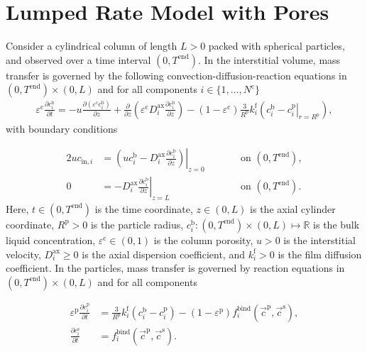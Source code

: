 \documentclass{article}
\begin{document}
\section*{Lumped Rate Model with Pores}
Consider a cylindrical column of length $L > 0$ packed with spherical particles, and observed over a time interval $(0, T^{\mathrm{end}})$.
In the interstitial volume, mass transfer is governed by the following convection-diffusion-reaction equations in $(0, T^\mathrm{end})\times (0, L)$ and for all components $i\in\{1, \dots, N^{\mathrm{c}} \}$
\begin{align}
\varepsilon^{\mathrm{c}} \frac{\partial c^{\mathrm{b}}_i}{\partial t} = - u \frac{\partial \left( \varepsilon^{\mathrm{c}} c^{\mathrm{b}}_i \right)}{\partial z} + \frac{\partial}{\partial z} \left( \varepsilon^{\mathrm{c}} D^{\mathrm{ax}}_{i} \frac{\partial c^{\mathrm{b}}_i}{\partial z} \right)- \left(1 - \varepsilon^{\mathrm{c}} \right) \frac{3}{R^{\mathrm{p}}} k^{\mathrm{f}}_{i} \left(c^{\mathrm{b}}_i - \left. c^{\mathrm{p}}_{i} \right|_{r = R^{\mathrm{p}}} \right),
\end{align}
with boundary conditions

\begin{alignat}{2}
u c_{\mathrm{in},i} &= \left.\left( u c^{\mathrm{b}}_i - D^{\mathrm{ax}}_{i} \frac{\partial c^{\mathrm{b}}_i}{\partial z}\right)\right|_{z=0} & &\qquad\text{on }(0, T^{\mathrm{end}}),\\
               0 &= - D^{\mathrm{ax}}_{i} \left. \frac{\partial c^{\mathrm{b}}_i}{\partial z} \right|_{z=L} & &\qquad\text{on }(0, T^{\mathrm{end}}).
\end{alignat}
Here, $t\in (0, T^{\mathrm{end}})$ is the time coordinate, $z\in (0, L)$ is the axial cylinder coordinate, $R^\mathrm{p}> 0$ is the particle radius, $c^{\mathrm{b}}_i\colon (0, T^\mathrm{end})\times (0, L) \mapsto \mathbb{R}$ is the bulk liquid concentration, $\varepsilon^{\mathrm{c}}\in (0, 1)$ is the column porosity, $u> 0$ is the interstitial velocity, $D^\mathrm{ax}_i\geq 0$ is the axial dispersion coefficient, and $k^\mathrm{f}_{i}> 0$ is the film diffusion coefficient.
In the particles, mass transfer is governed by reaction equations in $ (0, T^\mathrm{end}) \times (0, L)$ and for all components

\begin{align}

          \varepsilon^{\mathrm{p}}\frac{\partial c^{\mathrm{p}}_{i}}{\partial t} 
          &=\frac{3}{R^{\mathrm{p}}} k^\mathrm{f}_{i} \left( c^{\mathrm{b}}_{i} - c^{\mathrm{p}}_{i} \right) - \left( 1 - \varepsilon^{\mathrm{p}} \right) f^{\mathrm{bind}}_{i} \left( \vec{c}^{\mathrm{p}}, \vec{c}^{\mathrm{s}} \right) ,\\

          \frac{\partial c^{\mathrm{s}}_{i}}{\partial t}
          &= f^{\mathrm{bind}}_{i}\left( \vec{c}^{\mathrm{p}}, \vec{c}^{\mathrm{s}} \right).
\end{align}
\end{document}
